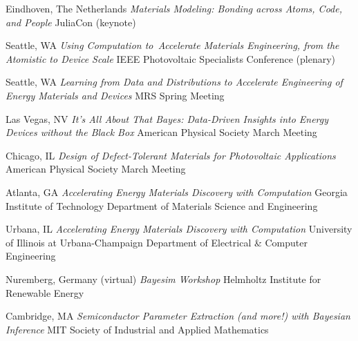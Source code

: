         {Eindhoven, The Netherlands}
        {\textit{Materials Modeling: Bonding across Atoms, Code, and People}}
        {JuliaCon (keynote)}

\vspace{\talksep}
\datedsubsection{}
        {Seattle, WA}
        {\textit{Using Computation to Accelerate Materials Engineering, from the Atomistic to Device Scale}}
        {IEEE Photovoltaic Specialists Conference (plenary)}

\vspace{\talksep}
\datedsubsection{}
        {Seattle, WA}
        {\textit{Learning from Data and Distributions to Accelerate Engineering of Energy Materials and Devices}}
        {MRS Spring Meeting}

\vspace{\talksep}
    {Las Vegas, NV}
    {\textit{It's All About That Bayes: Data-Driven Insights into Energy Devices without the Black Box}}
    {American Physical Society March Meeting}

\vspace{\talksep}
    {Chicago, IL}
    {\textit{Design of Defect-Tolerant Materials for Photovoltaic Applications}}
    {American Physical Society March Meeting}

\vspace{\talksep}
    {Atlanta, GA}
    {\textit{Accelerating Energy Materials Discovery with Computation}}
    {Georgia Institute of Technology Department of Materials Science and Engineering}

\vspace{\talksep}
\datedsubsection{}
    {Urbana, IL}
    {\textit{Accelerating Energy Materials Discovery with Computation}}
    {University of Illinois at Urbana-Champaign Department of Electrical \& Computer Engineering}

\vspace{\talksep}
    {Nuremberg, Germany (virtual)}
    {\textit{Bayesim Workshop}}
    {Helmholtz Institute for Renewable Energy}

\vspace{\talksep}
    {Cambridge, MA}
    {\textit{Semiconductor Parameter Extraction (and more!) with Bayesian Inference}}
    {MIT Society of Industrial and Applied Mathematics}
